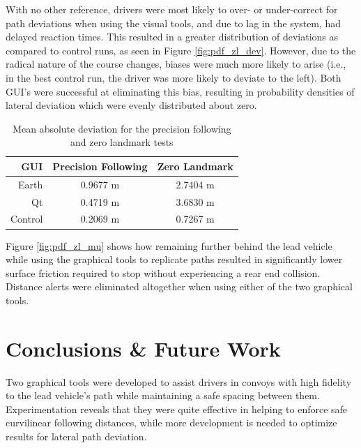 \documentclass[twocolumn,10pt]{article}
\begin{document}
    With no other reference, drivers were most likely to over- or under-correct for path deviations when using the visual tools, and due to lag in the system, had delayed reaction times. This resulted in a greater distribution of deviations as compared to control runs, as seen in Figure \ref{fig:pdf_zl_dev}. However, due to the radical nature of the course changes, biases were much more likely to arise (i.e., in the best control run, the driver was more likely to deviate to the left). Both GUI's were successful at eliminating this bias, resulting in probability densities of lateral deviation which were evenly distributed about zero.



    \begin{table}[htbp] \centering
      \caption{Mean absolute deviation for the precision following and zero landmark tests}
      \begin{tabular}{r|c|c|} 
        GUI&         Precision Following & Zero Landmark \\
        \hline
        Earth&      0.9677 m & 2.7404 m \\
        Qt&         0.4719 m & 3.6830 m \\
        Control&    0.2069 m & 0.7267 m \\ \hline 
      \end{tabular}
      \label{tab:dev_mean}
    \end{table}
    
    Figure \ref{fig:pdf_zl_mu} shows how remaining further behind the lead vehicle while using the graphical tools to replicate paths resulted in significantly lower surface friction required to stop without experiencing a rear end collision. Distance alerts were eliminated altogether when using either of the two graphical tools.




\section*{Conclusions \& Future Work}

  Two graphical tools were developed to assist drivers in convoys with high fidelity to the lead vehicle's path while maintaining a safe spacing between them.  Experimentation reveals that they were quite effective in helping to enforce safe curvilinear following distances, while more development is needed to optimize results for lateral path deviation.  
\end{document}
